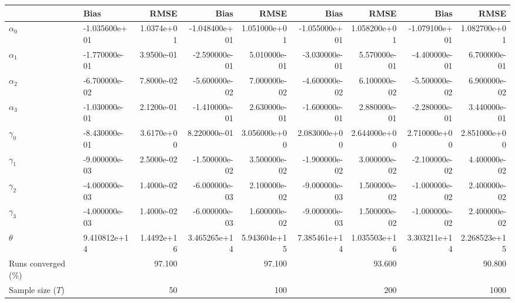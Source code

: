 
\begin{tabular}[t]{llrrrrrrr}
\toprule
  & Bias & RMSE & Bias & RMSE & Bias & RMSE & Bias & RMSE\\
\midrule
$\alpha_{0}$ & -1.035600e+01 & 1.0374e+01 & -1.048400e+01 & 1.051000e+01 & -1.055000e+01 & 1.058200e+01 & -1.079100e+01 & 1.082700e+01\\
$\alpha_{1}$ & -1.770000e-01 & 3.9500e-01 & -2.590000e-01 & 5.010000e-01 & -3.030000e-01 & 5.570000e-01 & -4.400000e-01 & 6.700000e-01\\
$\alpha_{2}$ & -6.700000e-02 & 7.8000e-02 & -5.600000e-02 & 7.000000e-02 & -4.600000e-02 & 6.100000e-02 & -5.500000e-02 & 6.900000e-02\\
$\alpha_{3}$ & -1.030000e-01 & 2.1200e-01 & -1.410000e-01 & 2.630000e-01 & -1.600000e-01 & 2.880000e-01 & -2.280000e-01 & 3.440000e-01\\
$\gamma_{0}$ & -8.430000e-01 & 3.6170e+00 & 8.220000e-01 & 3.056000e+00 & 2.083000e+00 & 2.644000e+00 & 2.710000e+00 & 2.851000e+00\\
$\gamma_{1}$ & -9.000000e-03 & 2.5000e-02 & -1.500000e-02 & 3.500000e-02 & -1.900000e-02 & 3.000000e-02 & -2.100000e-02 & 4.400000e-02\\
$\gamma_{2}$ & -4.000000e-03 & 1.4000e-02 & -6.000000e-03 & 2.100000e-02 & -9.000000e-03 & 1.500000e-02 & -1.000000e-02 & 2.400000e-02\\
$\gamma_{3}$ & -4.000000e-03 & 1.4000e-02 & -6.000000e-03 & 1.600000e-02 & -9.000000e-03 & 1.500000e-02 & -1.000000e-02 & 2.400000e-02\\
$\theta$ & 9.410812e+14 & 1.4492e+16 & 3.465265e+14 & 5.943604e+15 & 7.385461e+14 & 1.035503e+16 & 3.303211e+14 & 2.268523e+15\\
Runs converged (\%) &  & 97.100 &  & 97.100 &  & 93.600 &  & 90.800\\
Sample size ($T$) &  & 50 &  & 100 &  & 200 &  & 1000\\
\bottomrule
\end{tabular}
